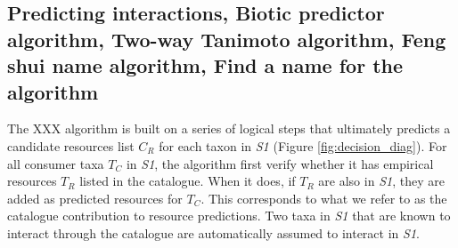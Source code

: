 \documentclass[letterpaper]{article}
\begin{document}
  \subsection{Predicting interactions, Biotic predictor algorithm, Two-way Tanimoto algorithm, Feng shui name algorithm, Find a name for the algorithm}

The XXX algorithm is built on a series of logical steps that ultimately predicts a candidate resources list $C_R$ for each taxon in \textit{S1} (Figure \ref{fig:decision_diag}). For all consumer taxa $T_C$ in \textit{S1}, the algorithm first verify whether it has empirical resources $T_R$ listed in the catalogue. When it does, if $T_R$ are also in \textit{S1}, they are added as predicted resources for $T_C$. This corresponds to what we refer to as the catalogue contribution to resource predictions. Two taxa in \textit{S1} that are known to interact through the catalogue are automatically assumed to interact in \textit{S1}.
\end{document}
